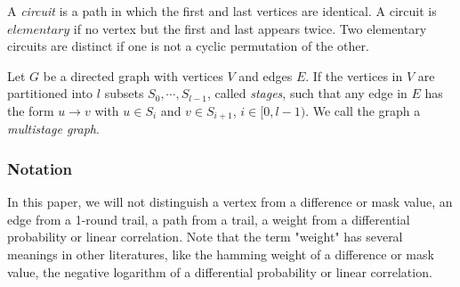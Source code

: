 A \textit{circuit} is a path in which the first and last vertices are identical. A circuit is $elementary$ if no vertex but the first and last appears twice. Two elementary circuits are distinct if one is not a cyclic permutation of the other. 


Let $G$ be a directed graph with vertices $V$ and edges $E$. If the vertices in $V$ are partitioned into $l$ subsets $S_0,\cdots,S_{l-1}$, called \textit{stages}, such that any edge in $E$ has the form $u\rightarrow v$ with $u\in S_i$ and $v\in S_{i+1}$, $i\in[0,l-1)$. We call the graph a \textit{multistage graph}.

\subsubsection{Notation} In this paper, we will not distinguish a vertex from a difference or mask value, an edge from a 1-round trail, a path from a trail, a weight from a differential probability or linear correlation. Note that the term "weight" has several meanings in other literatures, like the hamming weight of a difference or mask value, the negative logarithm of a differential probability or linear correlation. 
